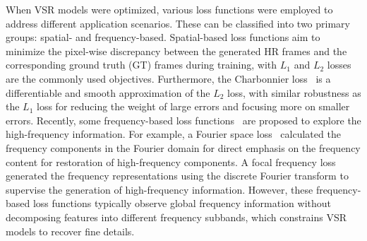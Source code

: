 When VSR models were optimized, various loss functions were employed to address different application scenarios. 
These can be classified into two primary groups: spatial- and frequency-based. 
Spatial-based loss functions aim to minimize the pixel-wise discrepancy between the generated HR frames and the corresponding ground truth (GT) frames during training, with $L_1$ and $L_2$ losses are the commonly used objectives. Furthermore, the Charbonnier loss~\cite{lai2018fast} is a differentiable and smooth approximation of the $L_2$ loss, with similar robustness as the $L_1$ loss for reducing the weight of large errors and focusing more on smaller errors. Recently, some frequency-based loss functions~\cite{fuoli2021fourier,li2023multi,jiang2021focal} are proposed to explore the high-frequency information. For example, a Fourier space loss~\cite{fuoli2021fourier} calculated the frequency components in the Fourier domain for direct emphasis on the frequency content for restoration of high-frequency components. A focal frequency loss~\cite{jiang2021focal} generated the frequency representations using the discrete Fourier transform to supervise the generation of high-frequency information. However, these frequency-based loss functions typically observe global frequency information without decomposing features into different frequency subbands, which constrains VSR models to recover fine details. 




